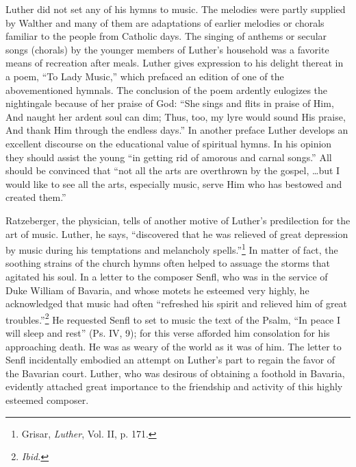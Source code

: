 Luther did not set any of his hymns to music. The melodies were
partly supplied by Walther and many of them are adaptations of earlier
melodies or chorals familiar to the people from Catholic days.
The singing of anthems or secular songs (chorals) by the younger
members of Luther’s household was a favorite means of recreation
after meals. Luther gives expression to his delight thereat in a poem,
“To Lady Music,” which prefaced an edition of one of the abovementioned
hymnals. The conclusion of the poem ardently eulogizes
the nightingale because of her praise of God: “She sings and flits in
praise of Him, And naught her ardent soul can dim; Thus, too, my
lyre would sound His praise, And thank Him through the endless
days.” In another preface Luther develops an excellent discourse on
the educational value of spiritual hymns. In his opinion they should
assist the young “in getting rid of amorous and carnal songs.” All
should be convinced that “not all the arts are overthrown by the
gospel, \dots but I would like to see all the arts, especially music, serve
Him who has bestowed and created them.”

Ratzeberger, the physician, tells of another motive of Luther’s
predilection for the art of music. Luther, he says, “discovered that
he was relieved of great depression by music during his temptations
and melancholy spells.”\footnote{Grisar, \textit{Luther}, Vol. II, p. 171.}
 In matter of fact, the soothing strains of
the church hymns often helped to assuage the storms that agitated
his soul. In a letter to the composer Senfl, who was in the service of
Duke William of Bavaria, and whose motets he esteemed very highly,
he acknowledged that music had often “refreshed his spirit and relieved
him of great troubles.”\footnote{\textit{Ibid.}}
 He requested Senfl to set to music
the text of the Psalm, “In peace I will sleep and rest” (Ps. IV, 9);
for this verse afforded him consolation for his approaching death.
He was as weary of the world as it was of him. The letter to Senfl
incidentally embodied an attempt on Luther’s part to regain the
favor of the Bavarian court. Luther, who was desirous of obtaining a
foothold in Bavaria, evidently attached great importance to the
friendship and activity of this highly esteemed composer.
